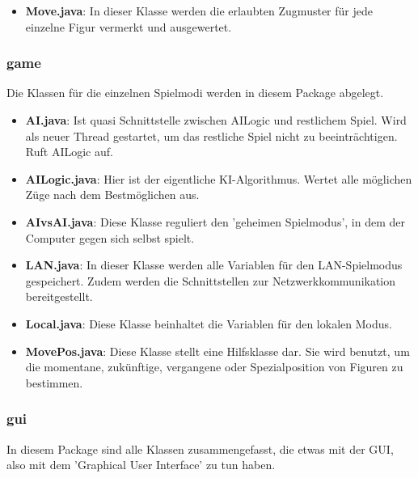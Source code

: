 \documentclass[12pt,a4paper]{article}
\begin{document}
{\begin{itemize}
	\item{\textbf{Move.java}: In dieser Klasse werden die erlaubten Zugmuster für jede einzelne Figur vermerkt und ausgewertet.  }

\end{itemize}
 
\subsubsection{game}

Die Klassen für die einzelnen Spielmodi werden in diesem Package abgelegt. 


\begin{itemize}

	\item{\textbf{AI.java}: Ist quasi Schnittstelle zwischen AILogic und restlichem Spiel. Wird als neuer Thread gestartet, um das restliche Spiel nicht zu beeinträchtigen. Ruft AILogic auf.}
	
	\item{\textbf{AILogic.java}: Hier ist der eigentliche KI-Algorithmus. Wertet alle möglichen Züge nach dem Bestmöglichen aus.}

	\item{\textbf{AIvsAI.java}: Diese Klasse reguliert den 'geheimen Spielmodus', in dem der Computer gegen sich selbst spielt. }
	
	\item{\textbf{LAN.java}: In dieser Klasse werden alle Variablen für den LAN-Spielmodus gespeichert. Zudem werden die Schnittstellen zur Netzwerkkommunikation bereitgestellt.}
	
	\item{\textbf{Local.java}: Diese Klasse beinhaltet die Variablen für den lokalen Modus. }

	\item{\textbf{MovePos.java}: Diese Klasse stellt eine Hilfsklasse dar. Sie wird benutzt, um die momentane, zukünftige, vergangene oder Spezialposition von Figuren zu bestimmen.}

\end{itemize}

\subsubsection{gui}

In diesem Package sind alle Klassen zusammengefasst, die etwas mit der GUI, also mit dem 'Graphical User Interface' zu tun haben. 

}
\end{document}
